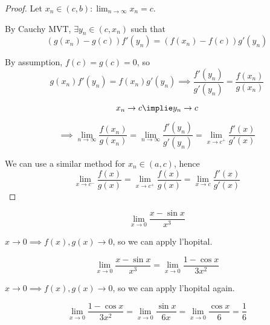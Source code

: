 \documentclass[a4paper,10pt]{article}
\begin{document}
\begin{proof}
	Let $x_n \in (c,b) : \lim_{n \to \infty} x_n = c$.

	By Cauchy MVT, $\exists y_n \in (c, x_n)$ such that
	\[ (g(x_n) - g(c))f'(y_n) = (f(x_n) - f(c))g'(y_n) \]

	By assumption, $f(c) = g(c) = 0$, so
	\[
		g(x_n)f'(y_n) = f(x_n)g'(y_n)
		\implies
		\frac{f'(y_n)}{g'(y_n)} = \frac{f(x_n)}{g(x_n)}
	\]

	\[ x_n \to c \implie y_n \to c \]

	\[
		\implies
		\lim_{n \to \infty}\frac{f(x_n)}{g(x_n)}
		= \lim_{n \to \infty}\frac{f'(y_n)}{g'(y_n)}
		= \lim_{x \to c^+}\frac{f'(x)}{g'(x)}
	\]

	We can use a similar method for $x_n \in (a,c)$, hence
	\[
		\lim_{x \to c^-}\frac{f(x)}{g(x)}
		= \lim_{x \to c^+}\frac{f(x)}{g(x)}
		= \lim_{x \to c}\frac{f'(x)}{g'(x)}
	\]
\end{proof}

\begin{ex}
	\[ \lim_{x \to 0} \frac{x - \sin x}{x^3} \]

	$x \to 0 \implies f(x), g(x) \to 0$, so we can apply l'hopital.

	\[
		\lim_{x \to 0} \frac{x - \sin x}{x^3}
		= \lim_{x \to 0} \frac{1 - \cos x}{3x^2}
	\]

	$x \to 0 \implies f(x), g(x) \to 0$, so we can apply l'hopital again.

	\[
		\lim_{x \to 0} \frac{1 - \cos x}{3x^2}
		= \lim_{x \to 0} \frac{\sin x}{6x}
		= \lim_{x \to 0} \frac{\cos x}{6}
		= \frac{1}{6}
	\]

\end{ex}
\end{document}
